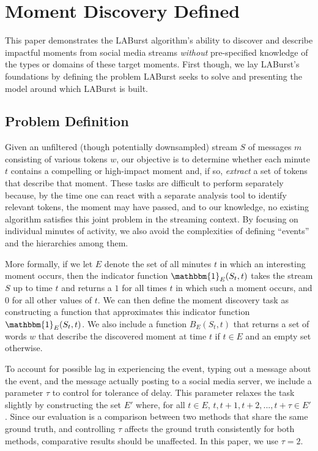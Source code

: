 \documentclass[letterpaper]{article}
\begin{document}
\section{Moment Discovery Defined}
\label{sect:model}

This paper demonstrates the LABurst algorithm's ability to discover and describe impactful moments from social media streams \emph{without} pre-specified knowledge of the types or domains of these target moments.
First though, we lay LABurst's foundations by defining the problem LABurst seeks to solve and presenting the model around which LABurst is built.

\subsection{Problem Definition}

Given an unfiltered (though potentially downsampled) stream $S$ of messages $m$ consisting of various tokens $w$, our objective is to determine whether each minute $t$ contains a compelling or high-impact moment and, if so, \emph{extract} a set of tokens that describe that moment.
These tasks are difficult to perform separately because, by the time one can react with a separate analysis tool to identify relevant tokens, the moment may have passed, and to our knowledge, no existing algorithm satisfies this joint problem in the streaming context.
By focusing on individual minutes of activity, we also avoid the complexities of defining ``events'' and the hierarchies among them.

More formally, if we let $E$ denote the set of all minutes $t$ in which an interesting moment occurs, then the indicator function $\mathbbm{1}_E(S_t, t)$ takes the stream $S$ up to time $t$ and returns a $1$ for all times $t$ in which such a moment occurs, and $0$ for all other values of $t$. 
We can then define the moment discovery task as constructing a function that approximates this indicator function $\mathbbm{1}_E(S_t, t)$.
We also include a function $B_E(S_t, t)$ that returns a set of words $w$ that describe the discovered moment at time $t$ if $t \in E$ and an empty set otherwise.

To account for possible lag in experiencing the event, typing out a message about the event, and the message actually posting to a social media server, we include a parameter $\tau$ to control for tolerance of delay.
This parameter relaxes the task slightly by constructing the set $E'$ where, for all $t \in E$, $t, t+1, t+2, ..., t+\tau \in E'$.
Since our evaluation is a comparison between two methods that share the same ground truth, and controlling $\tau$ affects the ground truth consistently for both methods, comparative results should be unaffected.
In this paper, we use $\tau=2$.
\end{document}
